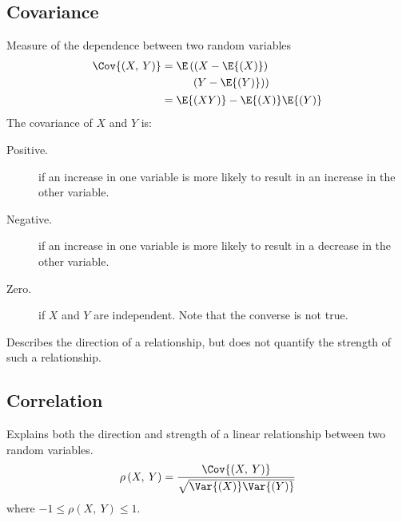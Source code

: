 \documentclass{article}
\begin{document}
\begin{multicols}{3}
    \subsection{Covariance}
    Measure of the dependence between two random variables
    \begin{align*}
        \Cov{\left( X,\: Y \right)} & = \begin{aligned}[t]
                                            \E\left( \left( X - \E{\left( X \right)} \right) \right. & \\
                                            \left. \left( Y - \E{\left( Y \right)} \right) \right)   &
                                        \end{aligned}                        \\
                                    & = \E{\left( XY \right)} - \E{\left( X \right)} \E{\left( Y \right)}
    \end{align*}
    The covariance of \(X\) and \(Y\) is:
    \begin{description}
        \item[Positive.] if an increase in one variable is more likely to result in an increase in
            the other variable.
        \item[Negative.] if an increase in one variable is more likely to result in a decrease in
            the other variable.
        \item[Zero.] if \(X\) and \(Y\) are independent. Note that the converse is not true.
    \end{description}
    Describes the direction of a relationship, but does not quantify the strength of such a relationship.
    \subsection{Correlation}
    Explains both the direction and strength of a linear relationship between two random variables.
    \begin{equation*}
        \rho\left( X,\: Y \right) = \frac{\Cov{\left( X,\: Y \right)}}{\sqrt{\Var{\left( X \right)} \Var{\left( Y \right)}}}
    \end{equation*}
    where \(-1 \leq \rho\left( X,\: Y \right) \leq 1\).


\end{multicols}
\end{document}
